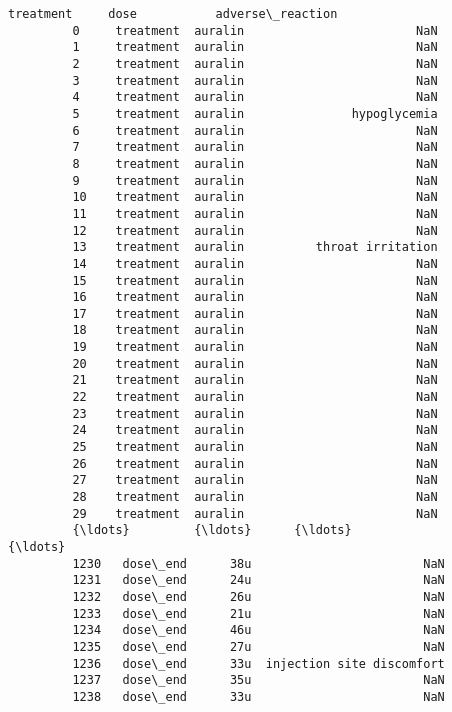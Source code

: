 \documentclass[11pt]{article}
\begin{document}
\begin{Verbatim}[commandchars=\\\{\}]
               treatment     dose           adverse\_reaction  
         0     treatment  auralin                        NaN  
         1     treatment  auralin                        NaN  
         2     treatment  auralin                        NaN  
         3     treatment  auralin                        NaN  
         4     treatment  auralin                        NaN  
         5     treatment  auralin               hypoglycemia  
         6     treatment  auralin                        NaN  
         7     treatment  auralin                        NaN  
         8     treatment  auralin                        NaN  
         9     treatment  auralin                        NaN  
         10    treatment  auralin                        NaN  
         11    treatment  auralin                        NaN  
         12    treatment  auralin                        NaN  
         13    treatment  auralin          throat irritation  
         14    treatment  auralin                        NaN  
         15    treatment  auralin                        NaN  
         16    treatment  auralin                        NaN  
         17    treatment  auralin                        NaN  
         18    treatment  auralin                        NaN  
         19    treatment  auralin                        NaN  
         20    treatment  auralin                        NaN  
         21    treatment  auralin                        NaN  
         22    treatment  auralin                        NaN  
         23    treatment  auralin                        NaN  
         24    treatment  auralin                        NaN  
         25    treatment  auralin                        NaN  
         26    treatment  auralin                        NaN  
         27    treatment  auralin                        NaN  
         28    treatment  auralin                        NaN  
         29    treatment  auralin                        NaN  
         {\ldots}         {\ldots}      {\ldots}                        {\ldots}  
         1230   dose\_end      38u                        NaN  
         1231   dose\_end      24u                        NaN  
         1232   dose\_end      26u                        NaN  
         1233   dose\_end      21u                        NaN  
         1234   dose\_end      46u                        NaN  
         1235   dose\_end      27u                        NaN  
         1236   dose\_end      33u  injection site discomfort  
         1237   dose\_end      35u                        NaN  
         1238   dose\_end      33u                        NaN  

\end{Verbatim}
\end{document}
